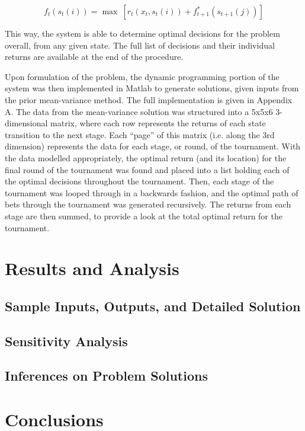 \documentclass[12pt]{article}
\begin{document}
\begin{equation}
f_{t}(s_{t}(i)) = \max \ [r_{t}(x_{t},s_{t}(i)) + f^{*}_{t+1}(s_{t+1}(j))]
\label{dp_recursive}
\end{equation}

This way, the system is able to determine optimal decisions for the problem overall, from any given state.
The full list of decisions and their individual returns are available at the end of the procedure.

Upon formulation of the problem, the dynamic programming portion of the system was then implemented in Matlab to generate solutions, given inputs from the prior mean-variance method.
The full implementation is given in Appendix A.
The data from the mean-variance solution was structured into a 5x5x6 3-dimensional matrix, where each row represents the returns of each state transition to the next stage.
Each ``page'' of this matrix (i.e. along the 3rd dimension) represents the data for each stage, or round, of the tournament.
With the data modelled appropriately, the optimal return (and its location) for the final round of the tournament was found and placed into a list holding each of the optimal decisions throughout the tournament.
Then, each stage of the tournament was looped through in a backwards fashion, and the optimal path of bets through the tournament was generated recursively.
The returns from each stage are then summed, to provide a look at the total optimal return for the tournament.

\section{Results and Analysis}
\subsection{Sample Inputs, Outputs, and Detailed Solution}


\subsection{Sensitivity Analysis}


\subsection{Inferences on Problem Solutions}

\newpage
\section{Conclusions}
\end{document}
